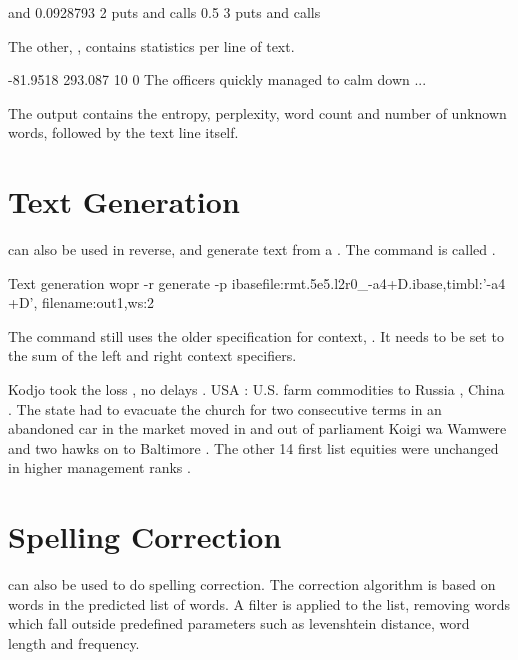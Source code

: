 \documentclass[a4paper,10pt,twoside]{report}
\begin{document}
\begin{wout}{}
and 0.0928793 2 puts and
calls 0.5 3 puts and calls
\end{wout}

The other, , contains statistics per line of text.

\begin{wout}{}
-81.9518 293.087 10 0 The officers quickly managed to calm down ...
\end{wout}

The output contains the entropy, perplexity, word count and number of
unknown words, followed by the text line itself.

\section{Text Generation}

\Wopr{} can also be used in reverse, and generate text from a
\lm{}. The command is called .

\begin{bash}{Text generation}
wopr -r generate -p ibasefile:rmt.5e5.l2r0_-a4+D.ibase,timbl:'-a4 +D',
                    filename:out1,ws:2
\end{bash}

The command still uses the older specification for context,
. It needs to be set to the sum of the left and right context
specifiers. 

\begin{wout}{}
Kodjo took the loss , no delays . 
USA : U.S. farm commodities to Russia , China . 
The state had to evacuate the church for two consecutive terms in an 
   abandoned car in the market moved in and out of parliament Koigi 
   wa Wamwere and two hawks on to Baltimore . 
The other 14 first list equities were unchanged in higher management
   ranks . 
\end{wout}


\section{Spelling Correction}

\Wopr{} can also be used to do spelling correction. The correction
algorithm is based on words in the predicted list of words. A filter
is applied to the list, removing words which fall outside predefined
parameters such as levenshtein distance, word length and frequency.
\end{document}
